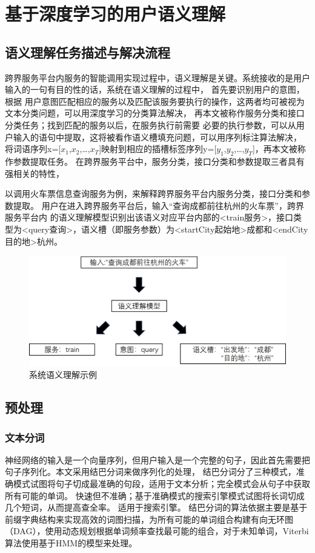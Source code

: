 \chapter{基于深度学习的用户语义理解}

\section{语义理解任务描述与解决流程}
跨界服务平台内服务的智能调用实现过程中，语义理解是关键。系统接收的是用户输入的一句有目的性的话，系统在语义理解的过程中，
首先要识别用户的意图，根据
用户意图匹配相应的服务以及匹配该服务要执行的操作，这两者均可被视为文本分类问题，可以用深度学习的分类算法解决，
再本文被称作服务分类和接口分类任务；找到匹配的服务以后，在服务执行前需要
必要的执行参数，可以从用户输入的语句中提取，这将被看作语义槽填充问题，可以用序列标注算法解决，
将词语序列x=[$x_{1}$,$x_{2}$,\dots,$x_{T}$]映射到相应的插槽标签序列y=[$y_{1}$,$y_{2}$,\dots,$y_{T}$]，再本文被称作参数提取任务。
在跨界服务平台中，服务分类，接口分类和参数提取三者具有强相关的特性，

以调用火车票信息查询服务为例，来解释跨界服务平台内服务分类，接口分类和参数提取。
用户在进入跨界服务平台后，输入“查询成都前往杭州的火车票”，跨界服务平台内
的语义理解模型识别出该语义对应平台内部的<train服务>，接口类型为<query查询>，语义槽（即服务参数）为<startCity起始地>成都和<endCity目的地>杭州。


\begin{figure}[htbp]
    \centering
    \includegraphics[scale=0.5]{./images/questiondesc.jpg}
    \caption{系统语义理解示例}
    \label{fig:questiondesc}
  \end{figure}


\section{预处理}
\subsection{文本分词}
神经网络的输入是一个向量序列，但用户输入是一个完整的句子，因此首先需要把句子序列化。本文采用结巴分词来做序列化的处理，
结巴分词分了三种模式，准确模式试图将句子切成最准确的句段，适用于文本分析；完全模式会从句子中获取所有可能的单词。 快速但不准确；基于准确模式的搜索引擎模式试图将长词切成几个短词，从而提高查全率。 适用于搜索引擎。
结巴分词的算法依据主要是基于前缀字典结构来实现高效的词图扫描，为所有可能的单词组合构建有向无环图（DAG），使用动态规划根据单词频率查找最可能的组合，对于未知单词，Viterbi算法使用基于HMM的模型来处理。

